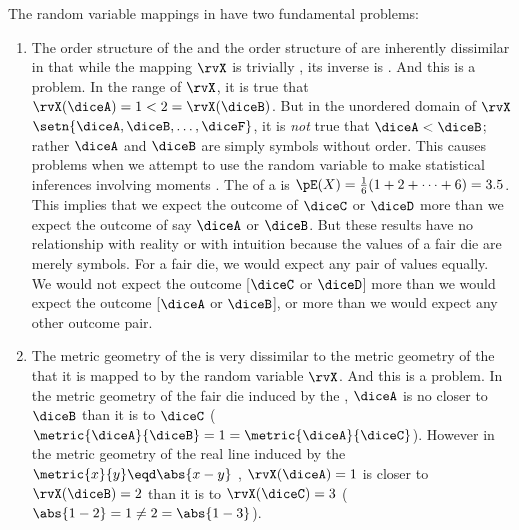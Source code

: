 \begin{tabstr}{0.75}
The random variable mappings in  have two fundamental problems:
\begin{enumerate}
  \item The order structure of the 
and the order structure of 
are inherently dissimilar in that 
while the   mapping $\rvX$ is trivially  , 
its inverse is .
And this is a problem.
In the   range of $\rvX$, it is true that $\rvX(\diceA)=1<2=\rvX(\diceB)$.
But in the unordered domain of $\rvX$ $\setn{\diceA,\diceB,\ldots,\diceF}$, it is \emph{not} true that $\diceA<\diceB$;
rather $\diceA$ and $\diceB$ are simply symbols without order.
This causes problems when we attempt to use the random variable to make statistical inferences involving moments .
The   of a   
is $\pE(X)=\frac{1}{6}(1+2+\cdots+6)=3.5$.
This implies that we expect the outcome of $\diceC$ or $\diceD$ more than we expect the outcome of say 
$\diceA$ or $\diceB$.
But these results have no relationship with reality or with intuition because the values of a fair die are merely symbols.
For a fair die, we would expect any pair of values equally.
We would not expect the outcome [$\diceC$ or $\diceD$] more than we would expect the outcome [$\diceA$ or $\diceB$],
or more than we would expect any other outcome pair.

  \item The metric geometry  of the  is very dissimilar to the 
metric geometry of the   that it is mapped to by the random variable $\rvX$.
And this is a problem.
In the metric geometry of the fair die induced by the  , 
$\diceA$ is no closer to $\diceB$ than it is to $\diceC$
($\metric{\diceA}{\diceB}=1=\metric{\diceA}{\diceC}$).
However in the metric geometry of the real line induced by the  $\metric{x}{y}\eqd\abs{x-y}$ ,
$\rvX(\diceA)=1$ is closer to $\rvX(\diceB)=2$ than it is to $\rvX(\diceC)=3$
($\abs{1-2}=1\neq2=\abs{1-3}$).
\end{enumerate}




\end{tabstr}
